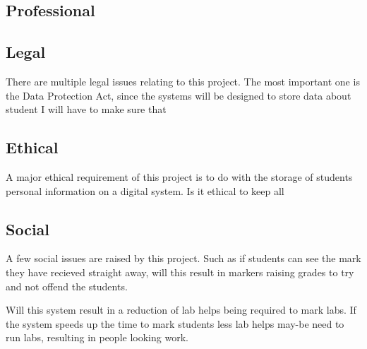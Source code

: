 \documentclass[12pt]{article}  %
\theoremstyle{definition}
\theoremstyle{remark}
\begin{document}
\subsection{Professional}

\subsection{Legal}
There are multiple legal issues relating to this project. The most important one is the Data Protection Act, since the systems will be designed to store data about student I will have to make sure that 

\subsection{Ethical}

A major ethical requirement of this project is to do with the storage of students personal information on a digital system. Is it ethical to keep all 

\subsection{Social}

A few social issues are raised by this project. Such as if students can see the mark they have recieved straight away, will this result in markers raising grades to try and not offend the students.

Will this system result in a reduction of lab helps being required to mark labs. If the system speeds up the time to mark students less lab helps may-be need to run labs, resulting in people looking work.





%
%

\newpage
\end{document}

